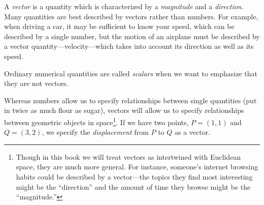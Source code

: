 A \emph{vector} is a quantity which is characterized by
a \emph{magnitude} and a \emph{direction}.   Many quantities are best
described by vectors rather than
numbers.  For example, when driving a car,
 it may be sufficient to
know your speed, which can be described by a single number,
 but the motion of an airplane must be described
by a vector quantity---velocity---which takes into account its
direction as well as its speed.

Ordinary numerical quantities are called \emph{scalars}
when we want to emphasize that they are not vectors.

Whereas numbers allow us to specify relationships between single quantities
(put in twice as much flour as sugar), vectors will allow us to specify
relationships between geometric objects in space\footnote{
	Though in this book we will treat vectors as intertwined with Euclidean
	space, they are much more general.  For instance, someone's internet
	browsing habits could be described by a vector---the topics they
	find most interesting might be the ``direction'' and the amount
	of time they browse might be the ``magnitude.''
}.  If we have two points, $P=(1,1)$ and $Q=(3,2)$, we specify the
\emph{displacement} from $P$ to $Q$ as a vector.

\begin{center}
	\usetikzlibrary{patterns,decorations.pathreplacing}
\end{center}

